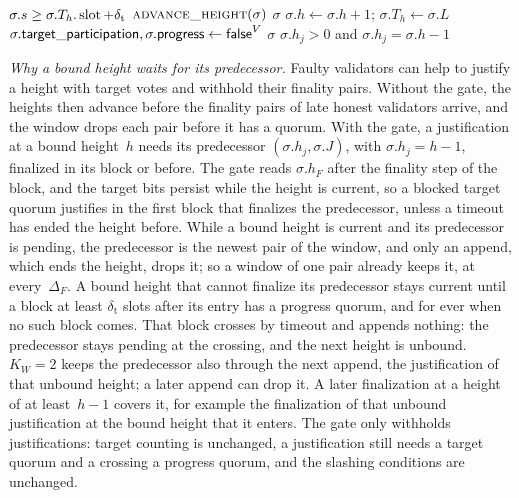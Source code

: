 {\begin{algorithmic}[1]
{      $\sigma.s\geq\sigma.T_h.\operatorname{slot}+\delta_{\mathrm{t}}$}
    \State \Return $\Call{advance\_height}{\sigma}$
  \EndIf
  \State \Return $\sigma$
\EndFunction
\vspace{1pt}
  \State $\sigma.h\gets\sigma.h+1$; \quad $\sigma.T_h\gets\sigma.L$
  \State $\sigma.\mathsf{target\_participation},
    \sigma.\mathsf{progress}\gets\mathsf{false}^{V}$
  \State \Return $\sigma$
\EndFunction
\vspace{1pt}
  \State \Return $\sigma.h_j>0$ and $\sigma.h_j=\sigma.h-1$
\EndFunction
\end{algorithmic}
}

\emph{Why a bound height waits for its predecessor.}  Faulty validators
can help to justify a height with target votes and withhold their
finality pairs.  Without the gate, the heights then advance before the
finality pairs of late honest validators arrive, and the window drops
each pair before it has a quorum.  With the gate, a justification at a
bound height~$h$ needs its predecessor $(\sigma.h_j,\sigma.J)$, with
$\sigma.h_j=h-1$, finalized in its block or before.  The gate reads
$\sigma.h_F$ after the finality step of the block, and the target bits
persist while the height is current, so a blocked target quorum
justifies in the first block that finalizes the predecessor, unless a
timeout has ended the height before.  While a bound height is current
and its predecessor is pending, the predecessor is the newest pair of the
window, and only an append, which ends the height, drops it; so a window
of one pair already keeps it, at every~$\Delta_F$.  A bound height that
cannot finalize its predecessor stays current until a block at least
$\delta_{\mathrm{t}}$ slots after its entry has a progress quorum, and
for ever when no such block comes.  That block crosses by timeout and
appends nothing: the predecessor stays pending at the crossing, and the
next height is unbound.  $K_W=2$ keeps the predecessor also through the next
append, the justification of that unbound height; a later append can
drop it.  A later finalization at a height of at least~$h-1$ covers it,
for example the finalization of that unbound justification at the bound
height that it enters.  The gate only withholds justifications: target
counting is unchanged, a justification still needs a target quorum and a
crossing a progress quorum, and the slashing conditions are unchanged.

